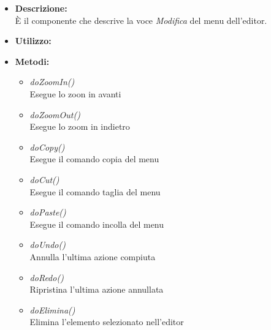 \begin{itemize}
	\item \textbf{Descrizione:}\\
	È il componente che descrive la voce \textit{Modifica} del menu dell'editor.
	\item \textbf{Utilizzo:}\\
	
	\item \textbf{Metodi:}
		\begin{itemize}
			\item \emph{doZoomIn()}\\
    		Esegue lo zoon in avanti
    		\item \emph{doZoomOut()}\\
    		Esegue lo zoom in indietro
    		\item \emph{doCopy()}\\
    		Esegue il comando copia del menu
    		\item \emph{doCut()}\\
    		Esegue il comando taglia del menu
    		\item \emph{doPaste()}\\
    		Esegue il comando incolla del menu
    		\item \emph{doUndo()}\\
    		Annulla l'ultima azione compiuta
    		\item \emph{doRedo()}\\
    		Ripristina l'ultima azione annullata
    		\item \emph{doElimina()}\\
    		Elimina l'elemento selezionato nell'editor	    		
		\end{itemize}
\end{itemize}